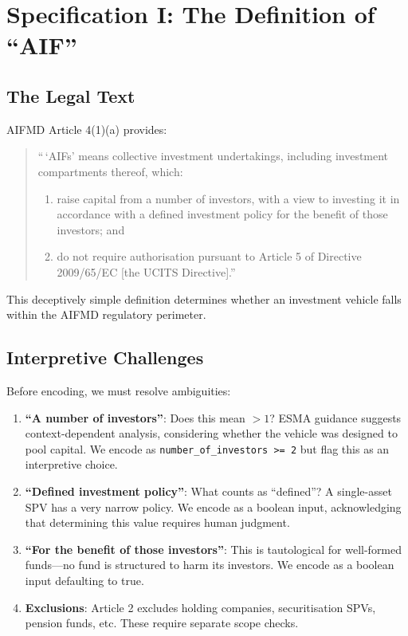 
\section{Specification I: The Definition of ``AIF''}
\label{sec:aif}

\subsection{The Legal Text}
\label{sec:aif-text}

AIFMD Article 4(1)(a) provides:

\begin{quote}
``\,`AIFs' means collective investment undertakings, including investment compartments thereof, which:
\begin{enumerate}
\renewcommand{\labelenumi}{(\roman{enumi})}
  \item raise capital from a number of investors, with a view to investing it in accordance with a defined investment policy for the benefit of those investors; and
  \item do not require authorisation pursuant to Article 5 of Directive 2009/65/EC [the UCITS Directive].''
\end{enumerate}
\end{quote}

\noindent This deceptively simple definition determines whether an investment vehicle falls within the AIFMD regulatory perimeter.

\subsection{Interpretive Challenges}
\label{sec:aif-interpretation}

Before encoding, we must resolve ambiguities:

\begin{enumerate}
  \item \textbf{``A number of investors''}: Does this mean $>1$? ESMA guidance suggests context-dependent analysis, considering whether the vehicle was designed to pool capital. We encode as \texttt{number\_of\_investors >= 2} but flag this as an interpretive choice.
  
  \item \textbf{``Defined investment policy''}: What counts as ``defined''? A single-asset SPV has a very narrow policy. We encode as a boolean input, acknowledging that determining this value requires human judgment.
  
  \item \textbf{``For the benefit of those investors''}: This is tautological for well-formed funds---no fund is structured to harm its investors. We encode as a boolean input defaulting to true.
  
  \item \textbf{Exclusions}: Article 2 excludes holding companies, securitisation SPVs, pension funds, etc. These require separate scope checks.
\end{enumerate}

